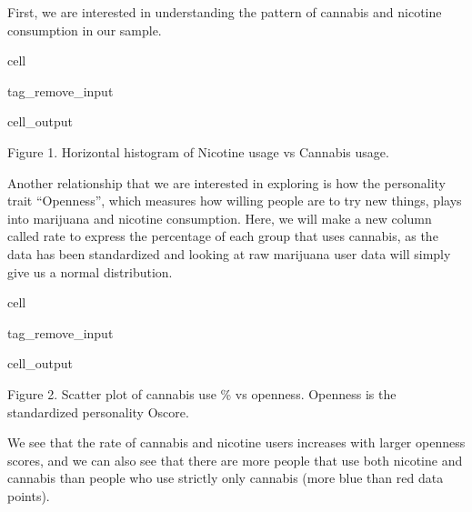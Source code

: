 \documentclass[letterpaper,10pt,english]{jupyterBook}
\begin{document}
\sphinxAtStartPar
First, we are interested in understanding the pattern of cannabis and nicotine consumption in our sample.

\begin{sphinxuseclass}{cell}
\begin{sphinxuseclass}{tag_remove_input}\begin{sphinxVerbatimOutput}

\begin{sphinxuseclass}{cell_output}
\noindent{}

\end{sphinxuseclass}\end{sphinxVerbatimOutput}

\end{sphinxuseclass}
\end{sphinxuseclass}
\sphinxAtStartPar
Figure 1. Horizontal histogram of Nicotine usage vs Cannabis usage.

\sphinxAtStartPar
Another relationship that we are interested in exploring is how the personality trait “Openness”, which measures how willing people are to try new things, plays into marijuana and nicotine consumption. Here, we will make a new column called rate to express the percentage of each group that uses cannabis, as the data has been standardized and looking at raw marijuana user data will simply give us a normal distribution.

\begin{sphinxuseclass}{cell}
\begin{sphinxuseclass}{tag_remove_input}\begin{sphinxVerbatimOutput}

\begin{sphinxuseclass}{cell_output}
\noindent{}

\end{sphinxuseclass}\end{sphinxVerbatimOutput}

\end{sphinxuseclass}
\end{sphinxuseclass}
\sphinxAtStartPar
Figure 2. Scatter plot of cannabis use \% vs openness. Openness is the standardized personality Oscore.

\sphinxAtStartPar
We see that the rate of cannabis and nicotine users increases with larger openness scores, and we can also see that there are more people that use both nicotine and cannabis than people who use strictly only cannabis (more blue than red data points).
\end{document}
